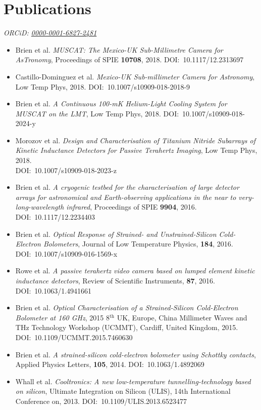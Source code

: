 \documentclass[11pt,a4paper]{moderncv}
\begin{document}
\section{Publications}
\textit{ORCiD: \href{ https://orcid.org/0000-0001-6827-2481}{0000-0001-6827-2481}}
\begin{itemize}
\item Brien et al. \textit{MUSCAT: The Mexico-UK Sub-Millimetre Camera for AsTronomy}, Proceedings of SPIE \textbf{10708}, 2018. \mbox{DOI: 10.1117/12.2313697}
\item Castillo-Dominguez et al. \textit{Mexico-UK Sub-millimeter Camera for Astronomy}, Low Temp Phys, 2018. \mbox{DOI: 10.1007/s10909-018-2018-9}
\item Brien et al. \textit{A Continuous 100-mK Helium-Light Cooling System for MUSCAT on the LMT}, Low Temp Phys, 2018. \mbox{DOI: 10.1007/s10909-018-2024-y}
\item Morozov et al. \textit{Design and Characterisation of Titanium Nitride Subarrays of Kinetic Inductance Detectors for Passive Terahertz Imaging},  Low Temp Phys, 2018. \\ \mbox{DOI: 10.1007/s10909-018-2023-z}
\item Brien et al. \textit{A cryogenic testbed for the characterisation of large detector arrays for astronomical and Earth-observing applications in the near to very-long-wavelength infrared}, Proceedings of SPIE \textbf{9904}, 2016. \mbox{DOI: 10.1117/12.2234403}
\item Brien et al. \textit{Optical Response of Strained- and Unstrained-Silicon Cold-Electron Bolometers}, Journal of Low Temperature Physics, \textbf{184}, 2016. \mbox{DOI: 10.1007/s10909-016-1569-x}
\item Rowe et al. \textit{A passive terahertz video camera based on lumped element kinetic inductance detectors}, Review of Scientific Instruments, \textbf{87}, 2016. \mbox{DOI: 10.1063/1.4941661}
\item Brien et al. \textit{Optical Characterisation of a Strained-Silicon Cold-Electron Bolometer at 160 GHz}, 2015 8$^{\mathrm{th}}$ UK, Europe, China Millimeter Waves and THz Technology Workshop (UCMMT), Cardiff, United Kingdom, 2015. \mbox{DOI: 10.1109/UCMMT.2015.7460630}
\item Brien et al. \textit{A strained-silicon cold-electron bolometer using Schottky contacts}, Applied Physics Letters, \textbf{105}, 2014. \mbox{DOI: 10.1063/1.4892069}
\item Whall et al. \textit{Cooltronics: A new low-temperature tunnelling-technology based on silicon}, Ultimate Integration on Silicon (ULIS), 14th International Conference on, 2013. \mbox{DOI: 10.1109/ULIS.2013.6523477}
\end{itemize}
%
\end{document}
